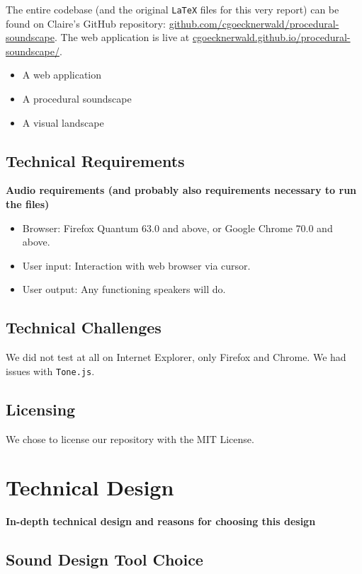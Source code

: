 \documentclass[12pt,a4paper]{article}
\newcommand{\code}{\texttt}
\newcommand{\lightcode}[1]{\colorbox{light-gray}{\texttt{#1}}}
\begin{document}
The entire codebase (and the original \code{LaTeX} files for this very report) can be found on Claire's GitHub repository: \href{https://github.com/cgoecknerwald/procedural-soundscape}{github.com/cgoecknerwald/procedural-soundscape}. The web application is live at \href{https://cgoecknerwald.github.io/procedural-soundscape/}{cgoecknerwald.github.io/procedural-soundscape/}.

\begin{itemize}
	\item A web application
	\item A procedural soundscape
	\item A visual landscape
\end{itemize}

\subsection{Technical Requirements}
\textbf{Audio requirements (and probably also requirements necessary to run the files)}

\begin{itemize}
	\item Browser: Firefox Quantum 63.0 and above, or Google Chrome 70.0 and above.
	\item User input: Interaction with web browser via cursor.
	\item User output: Any functioning speakers will do.
\end{itemize}

\subsection{Technical Challenges}
We did not test at all on Internet Explorer, only Firefox and Chrome. We had issues with \lightcode{Tone.js}.

\subsection{Licensing}
We chose to license our repository with the MIT License.


\pagebreak
\section{Technical Design}
\textbf{In-depth technical design and reasons for choosing this design}

\subsection{Sound Design Tool Choice}
\end{document}
